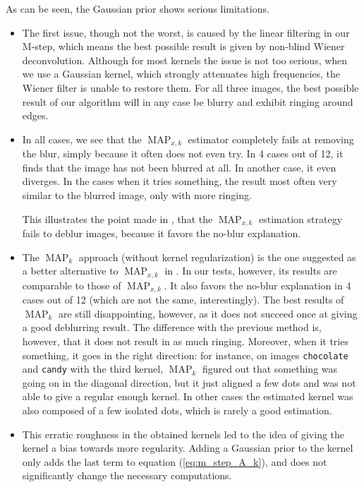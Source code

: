 \documentclass[english,a4paper]{article}
\theoremstyle{plain}
\theoremstyle{definition}
\theoremstyle{remark}
\DeclareMathOperator{\MAP}{MAP}
\begin{document}
As can be seen, the Gaussian prior shows serious limitations.
\begin{itemize}
	\item The first issue, though not the worst, is caused by the linear filtering in our M-step, which means the best possible result is given by non-blind Wiener deconvolution.
	Although for most kernels the issue is not too serious, when we use a Gaussian kernel, which strongly attenuates high frequencies, the Wiener filter is unable to restore them.
	For all three images, the best possible result of our algorithm will in any case be blurry and exhibit ringing around edges.
	
	\item In all cases, we see that the $\MAP_{x,k}$ estimator completely fails at removing the blur, simply because it often does not even try.
	In 4 cases out of 12, it finds that the image has not been blurred at all. In another case, it even diverges.
	In the cases when it tries something, the result most often very similar to the blurred image, only with more ringing.
	
	This illustrates the point made in \cite{levin2009understanding}, that the $\MAP_{x,k}$ estimation strategy fails to deblur images, because it favors the no-blur explanation.
	
	\item The $\MAP_k$ approach (without kernel regularization) is the one suggested as a better alternative to $\MAP_{x,k}$ in \cite{levin2009understanding}.
	In our tests, however, its results are comparable to those of $\MAP_{x,k}$.
	It also favors the no-blur explanation in 4 cases out of 12 (which are not the same, interestingly).
	The best results of $\MAP_k$ are still disappointing, however, as it does not succeed once at giving a good deblurring result.
	The difference with the previous method is, however, that it does not result in as much ringing. Moreover, when it tries something, it goes in the right direction: for instance, on images \texttt{chocolate} and \texttt{candy} with the third kernel, $\MAP_k$ figured out that something was going on in the diagonal direction, but it just aligned a few dots and was not able to give a regular enough kernel.
	In other cases the estimated kernel was also composed of a few isolated dots, which is rarely a good estimation.
	
	\item This erratic roughness in the obtained kernels led to the idea of giving the kernel a bias towards more regularity. Adding a Gaussian prior to the kernel only adds the last term to equation (\ref{eq:m_step_A_k}), and does not significantly change the necessary computations.
	

\end{itemize}
\end{document}
